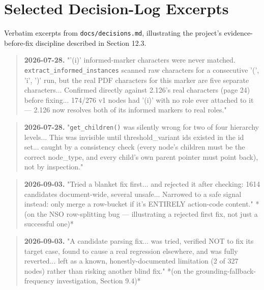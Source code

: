 \chapter{Selected Decision-Log Excerpts}
\label{ch:selected-decision-log-excerpts}
Verbatim excerpts from \texttt{docs/\allowbreak{}decisions.md}, illustrating the project's evidence-before-fix discipline described in Section 12.3.

\begin{quote}
\textbf{2026-07-28.} "'(i)' informed-marker characters were never matched. \texttt{extract\_\allowbreak{}informed\_\allowbreak{}instances} scanned raw characters for a consecutive '(', 'i', ')' run, but the real PDF characters for this marker are five separate characters... Confirmed directly against 2.126's real characters (page 24) before fixing... 174/276 v1 nodes had '(i)' with no role ever attached to it — 2.126 now resolves both of its informed markers to real roles."
\end{quote}
\begin{quote}
\textbf{2026-07-28.} "\texttt{get\_\allowbreak{}children()} was silently wrong for two of four hierarchy levels... This was invisible until threshold\_variant ids existed in the id set... caught by a consistency check (every node's children must be the correct node\_type, and every child's own parent pointer must point back), not by inspection."
\end{quote}
\begin{quote}
\textbf{2026-09-03.} "Tried a blanket fix first... and rejected it after checking: 1614 candidates document-wide, several unsafe... Narrowed to a safe signal instead: only merge a row-bucket if it's ENTIRELY action-code content." *(on the NSO row-splitting bug — illustrating a rejected first fix, not just a successful one)*
\end{quote}
\begin{quote}
\textbf{2026-09-03.} "A candidate parsing fix... was tried, verified NOT to fix its target case, found to cause a real regression elsewhere, and was fully reverted... left as a known, honestly-documented limitation (2 of 327 nodes) rather than risking another blind fix." *(on the grounding-fallback-frequency investigation, Section 9.4)*
\end{quote}
